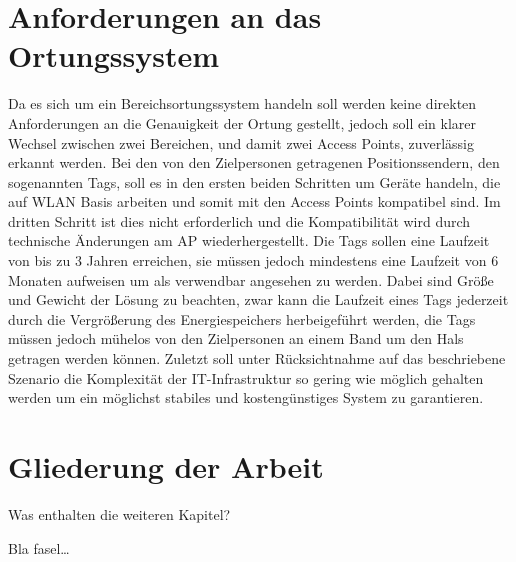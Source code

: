 \section{Anforderungen an das Ortungssystem}
\label{ch:Einleitung:sec:Anforderungen}
Da es sich um ein Bereichsortungssystem handeln soll werden keine direkten Anforderungen an die Genauigkeit der Ortung gestellt, jedoch soll ein klarer Wechsel zwischen zwei Bereichen, und damit zwei Access Points, zuverlässig erkannt werden. 
Bei den von den Zielpersonen getragenen Positionssendern, den sogenannten Tags, soll es in den ersten beiden Schritten um Geräte handeln, die auf WLAN Basis arbeiten und somit mit den Access Points kompatibel sind.
Im dritten Schritt ist dies nicht erforderlich und die Kompatibilität wird durch technische Änderungen am AP wiederhergestellt.
Die Tags sollen eine Laufzeit von bis zu 3 Jahren erreichen, sie müssen jedoch mindestens eine Laufzeit von 6 Monaten aufweisen um als verwendbar angesehen zu werden. 
Dabei sind Größe und Gewicht der Lösung zu beachten, zwar kann die Laufzeit eines Tags jederzeit durch die Vergrößerung des Energiespeichers herbeigeführt werden, die Tags müssen jedoch mühelos von den Zielpersonen an einem Band um den Hals getragen werden können.
Zuletzt soll unter Rücksichtnahme auf das beschriebene Szenario die Komplexität der IT-Infrastruktur so gering wie möglich gehalten werden um ein möglichst stabiles und kostengünstiges System zu garantieren. 

\section{Gliederung der Arbeit}
\label{ch:Einleitung:sec:Gliederung}

Was enthalten die weiteren Kapitel?

Bla fasel\ldots

